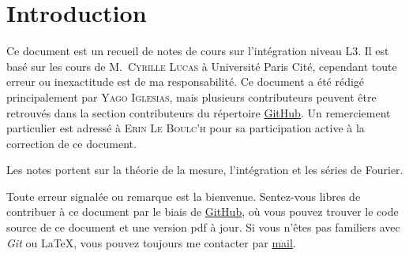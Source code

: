 \section{Introduction}

Ce document est un recueil de notes de cours sur l'intégration niveau L3. Il est
basé sur les cours de M.~\textsc{Cyrille Lucas} à Université Paris Cité, cependant toute
erreur ou inexactitude est de ma responsabilité.
Ce document a été rédigé principalement par \textsc{Yago Iglesias}, mais plusieurs contributeurs
peuvent être retrouvés dans la section contributeurs du répertoire
\href{https://github.com/Yag000/integration-notes/graphs/contributors}{GitHub}. Un remerciement
particulier est adressé à \textsc{Erin Le Boulc’h} pour sa participation active à la correction
de ce document.
\vspace{0.5cm}

Les notes portent sur la théorie de la mesure, l'intégration et les séries de Fourier.
\vspace{0.5cm}

Toute erreur signalée ou remarque est la bienvenue.
Sentez-vous libres de contribuer à ce document par le biais de \href{https://github.com/Yag000/integration-notes}{GitHub},
où vous pouvez trouver le code source de ce document et une version pdf à jour.
Si vous n'êtes pas familiers avec \textit{Git} ou \LaTeX, vous pouvez toujours me contacter
par \href{mailto: yago.iglesias.vazquez@gmail.com}{mail}.









